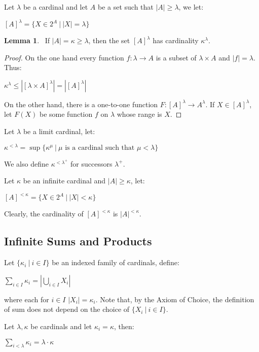 \documentclass[8pt]{article}
\theoremstyle{definition}
\theoremstyle{definition}
\theoremstyle{definition}
\theoremstyle{definition}
\theoremstyle{definition}
\theoremstyle{definition}
\theoremstyle{definition}
\theoremstyle{definition}
\newtheorem{lemma}{Lemma}[section]
\theoremstyle{definition}
\theoremstyle{definition}
\theoremstyle{definition}
\theoremstyle{definition}
\theoremstyle{definition}
\theoremstyle{definition}
\theoremstyle{question}
\begin{document}
Let $\lambda$ be a cardinal and let $A$ be a set such that $|A| \geq \lambda$, we let:
\begin{center}
  $[A]^{\lambda} = \{ X \in 2^A \: | \: |X| = \lambda \}$
\end{center}

\begin{lemma}~\label{cardfact1}
  If $|A| = \kappa \geq \lambda$, then the set $[A]^{\lambda}$ has cardinality $\kappa^{\lambda}$.
\end{lemma}

\begin{proof}
  On the one hand every function $f : \lambda \to A$ is a subset of $\lambda \times A$ and $|f| = \lambda$. Thus:
  \begin{center}
    $\kappa^{\lambda} \leq |[\lambda \times A]^{\lambda}| = |[A]^{\lambda}|$
  \end{center}
  On the other hand, there is a one-to-one function $F : [A]^{\lambda} \to A^{\lambda}$. 
  If $X \in [A]^{\lambda}$, let $F(X)$ be some function $f$ on $\lambda$ whose range is $X$.
\end{proof}

Let $\lambda$ be a limit cardinal, let:
\begin{center}
  $\kappa^{<\lambda} = \sup \{\kappa^{\mu} \: | \: \text{$\mu$ is a cardinal such that $\mu < \lambda$}\}$
\end{center}
We also define $\kappa^{<\lambda^{+}}$ for successors $\lambda^{+}$.

Let $\kappa$ be an infinite cardinal and $|A| \geq \kappa$, let:
\begin{center}
  $[A]^{<\kappa} = \{ X \in 2^{A} \: | \: |X| < \kappa \}$
\end{center}
Clearly, the cardinality of $[A]^{<\kappa}$ is $|A|^{<\kappa}$.

\subsection{Infinite Sums and Products}

Let $\{ \kappa_i \: | \: i \in I \}$ be an indexed family of cardinals, define:
\begin{center}
  $\sum \limits_{i \in I} \kappa_i = |\bigcup \limits_{i \in I} X_i|$
\end{center}
where each for $i \in I$ $|X_i| = \kappa_i$. Note that, by the Axiom of Choice, the definition of sum does not depend
on the choice of $\{ X_i \: | \: i \in I \}$.

Let $\lambda, \kappa$ be cardinals and let $\kappa_i = \kappa$, then:
\begin{center}
  $\sum \limits_{i < \lambda} \kappa_i = \lambda \cdot \kappa$
\end{center}
\end{document}
